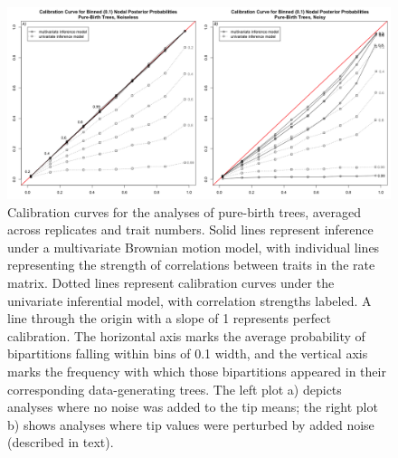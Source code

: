 \begin{figure}[h]
\centering
\includegraphics[width=\textwidth]{figures/calibrationCurvePBT.png}
\caption[Calibration Curves for the Brownian Motion Simulation Study, Idealized Conditions]{Calibration curves for the analyses of pure-birth trees, averaged across replicates and trait numbers. Solid lines represent inference under a multivariate Brownian motion model, with individual lines representing the strength of correlations between traits in the rate matrix. Dotted lines represent calibration curves under the univariate inferential model, with correlation strengths labeled. A line through the origin with a slope of 1 represents perfect calibration. The horizontal axis marks the average probability of bipartitions falling within bins of 0.1 width, and the vertical axis marks the frequency with which those bipartitions appeared in their corresponding data-generating trees. The left plot a) depicts analyses where no noise was added to the tip means; the right plot b) shows analyses where tip values were perturbed by added noise (described in text).
\label{overflow}
\label{fig:calibrationCurvePBT}
}
\end{figure}


